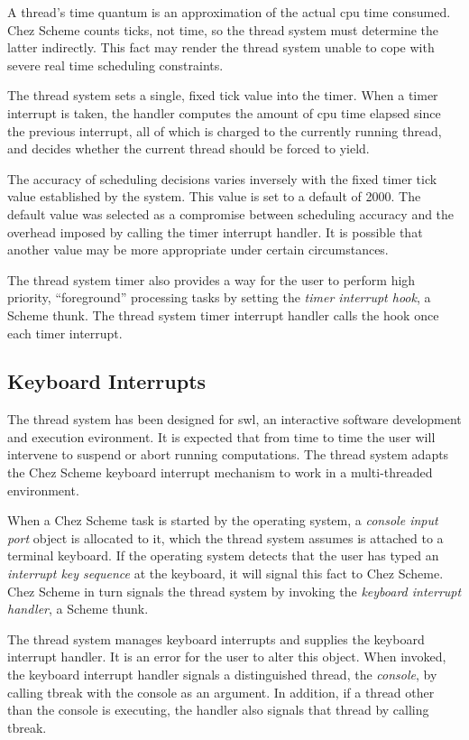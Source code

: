 \documentclass{article}
\begin{document}
A thread's time quantum is an approximation of the actual cpu time
consumed.  Chez Scheme counts ticks, not time, so the thread system
must determine the latter indirectly.  This fact may render the thread
system unable to cope with severe real time scheduling constraints.

The thread system sets a single, fixed tick value into the timer.
When a timer interrupt is taken, the handler computes the amount of
cpu time elapsed since the previous interrupt, all of which is charged
to the currently running thread, and decides whether the current
thread should be forced to yield.

The accuracy of scheduling decisions varies inversely with the fixed
timer tick value established by the system. This value is set to a
default of 2000.  The default value was selected as a compromise
between scheduling accuracy and the overhead imposed by calling the
timer interrupt handler.  It is possible that another value may be
more appropriate under certain circumstances.

The thread system timer also provides a way for the user to perform
high priority, ``foreground'' processing tasks by setting the {\em
timer interrupt hook}, a Scheme thunk.  The thread system timer
interrupt handler calls the hook once each timer interrupt.


\subsection{Keyboard Interrupts}

The thread system has been designed for {\sc swl}, an interactive software
development and execution evironment.  It is expected that from time
to time the user will intervene to suspend or abort running
computations.  The thread system adapts the Chez Scheme keyboard
interrupt mechanism to work in a multi-threaded environment.

When a Chez Scheme task is started by the operating system, a {\em
console input port} object is allocated to it, which the thread system
assumes is attached to a terminal keyboard.  If the operating system
detects that the user has typed an {\em interrupt key sequence} at the
keyboard, it will signal this fact to Chez Scheme.  Chez Scheme in
turn signals the thread system by invoking the {\em keyboard interrupt
handler}, a Scheme thunk.

The thread system manages keyboard interrupts and supplies the
keyboard interrupt handler.  It is an error for the user to alter this
object.  When invoked, the keyboard interrupt handler signals a
distinguished thread, the {\em console}, by calling {\sf tbreak} with
the console as an argument. In addition, if a thread other than the
console is executing, the handler also signals that thread by calling
tbreak.
\end{document}
